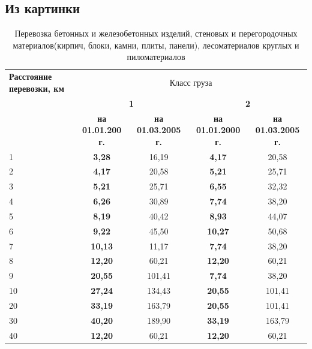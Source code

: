 \documentclass[a4paper,12pt]{article}
\begin{document}
    \subsection{Из картинки}
    \begin{table}[!htp]
        \centering
        \caption{Перевозка бетонных и железобетонных изделий, стеновых и перегородочных материалов(кирпич, блоки, камни, плиты, панели), лесоматериалов круглых и пиломатериалов}
        \label{tab:table1}
        \begin{tabular}{| p{} |c|c|c|c|}
            \hline
            \textbf{Расстояние перевозки, км} & \multicolumn{4}{|c|}{Класс груза} \\
            \cline{2-5}
            & \multicolumn{2}{|c|}{\textbf{1}} & \multicolumn{2}{|c|}{\textbf{2}} \\ 
            \cline{2-5}
            & \textbf{на 01.01.200 г.} & \textbf{на 01.03.2005 г.} & \textbf{ на 01.01.2000 г.} & \textbf{на 01.03.2005 г.} \\ \hline
            1 & \textbf{3,28} & 16,19 & \textbf{4,17} & 20,58 \\ 
            \hline
            2 & \textbf{4,17} & 20,58 & \textbf{5,21} & 25,71 \\ 
            \hline
            3 & \textbf{5,21} & 25,71 & \textbf{6,55} & 32,32 \\ 
            \hline
            4 & \textbf{6,26} & 30,89 & \textbf{7,74} & 38,20 \\ 
            \hline
            5 & \textbf{8,19} & 40,42 & \textbf{8,93} & 44,07 \\ 
            \hline
            6 & \textbf{9,22} & 45,50 & \textbf{10,27} & 50,68 \\ 
            \hline
            7 & \textbf{10,13} & 11,17 & \textbf{7,74} & 38,20\\ 
            \hline
            8 & \textbf{12,20} & 60,21 & \textbf{12,20} & 60,21\\ 
            \hline
            9 & \textbf{20,55} & 101,41 & \textbf{7,74} & 38,20\\ 
            \hline
            10 & \textbf{27,24} & 134,43 & \textbf{20,55} & 101,41\\ \hline
            20 & \textbf{ 33,19} & 163,79 &  \textbf{20,55} & 101,41 \\ \hline
            30 & \textbf{40,20} & 189,90 &  \textbf{ 33,19} & 163,79\\ \hline
            40 & \textbf{12,20} & 60,21 & \textbf{12,20} & 60,21\\ 

\end{tabular}
\end{table}
\end{document}
